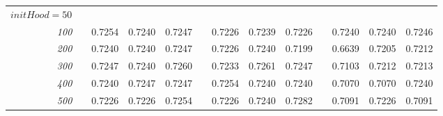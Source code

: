 \documentclass[a4paper, 10pt]{article}
\begin{document}
\begin{figure}[h]
\begin{tabular}{@{}rcrrrcrrrcrrr@{}}
      $initHood = 50$ \\
      \emph{100}  &&  0.7254  &  0.7240  &  0.7247  &&  0.7226  &  0.7239  &  0.7226  &&  0.7240  &  0.7240  &  0.7246 \\
      \emph{200}  &&  0.7240  &  0.7240  &  0.7247  &&  0.7226  &  0.7240  &  0.7199  &&  0.6639  &  0.7205  &  0.7212 \\
      \emph{300}  &&  0.7247  &  0.7240  &  0.7260  &&  0.7233  &  0.7261  &  0.7247  &&  0.7103  &  0.7212  &  0.7213 \\
      \emph{400}  &&  0.7240  &  0.7247  &  0.7247  &&  0.7254  &  0.7240  &  0.7240  &&  0.7070  &  0.7070  &  0.7240 \\
      \emph{500}  &&  0.7226  &  0.7226  &  0.7254  &&  0.7226  &  0.7240  &  0.7282  &&  0.7091  &  0.7226  &  0.7091 \\
%
%
%
%
         \bottomrule
      \end{tabular} 
      \caption{}
      \label{fig:bayes}
    \end{figure}




    
    
    
    
    
    
    
    
    
\end{document}
